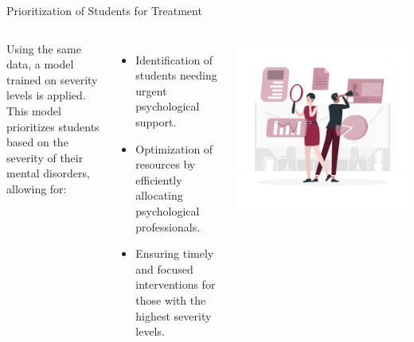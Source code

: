 \documentclass[10pt, xcolor=table]{beamer}
\let\olditem\item
\renewcommand\item{\olditem\justifying}
\begin{document}
\begin{frame}{Prioritization of Students for Treatment}
	
	\begin{columns}[c]
		\justifying
		Using the same data, a model trained on severity levels is applied. \\
		\vspace{0.3cm}
		This model prioritizes students based on the severity of their mental disorders, allowing for:
		\begin{itemize}
			\item Identification of students needing urgent psychological support.
			\item Optimization of resources by efficiently allocating psychological professionals.
			\item Ensuring timely and focused interventions for those with the highest severity levels.
		\end{itemize}
		
		\centering
		\vspace{-0.3cm}
		\includegraphics[width=\linewidth]{./figures/priorizing.png}
	\end{columns}
	
\end{frame}
\end{document}

